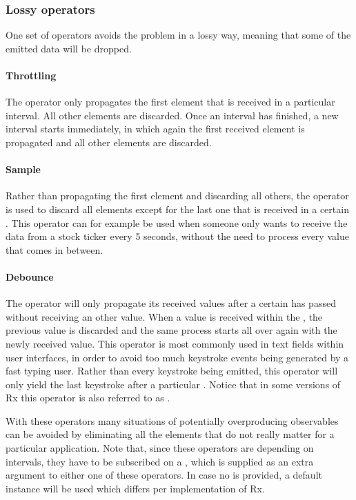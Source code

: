 \subsubsection{Lossy operators}
One set of operators avoids the problem in a lossy way, meaning that some of the emitted data will be dropped.

\paragraph{Throttling} The  operator only propagates the first element that is received in a particular interval. All other elements are discarded. Once an interval has finished, a new interval starts immediately, in which again the first received element is propagated and all other elements are discarded.

\paragraph{Sample} Rather than propagating the first element and discarding all others, the  operator is used to discard all elements except for the last one that is received in a certain . This operator can for example be used when someone only wants to receive the data from a stock ticker every 5 seconds, without the need to process every value that comes in between.

\paragraph{Debounce} The operator  will only propagate its received values after a certain  has passed without receiving an other value. When a value is received within the , the previous value is discarded and the same process starts all over again with the newly received value. This operator is most commonly used in text fields within user interfaces, in order to avoid too much keystroke events being generated by a fast typing user. Rather than every keystroke being emitted, this operator will only yield the last keystroke after a particular . Notice that in some versions of Rx this operator is also referred to as .

With these operators many situations of potentially overproducing observables can be avoided by eliminating all the elements that do not really matter for a particular application. Note that, since these operators are depending on intervals, they have to be subscribed on a \sch, which is supplied as an extra argument to either one of these operators. In case no \sch is provided, a default instance will be used which differs per implementation of Rx.

